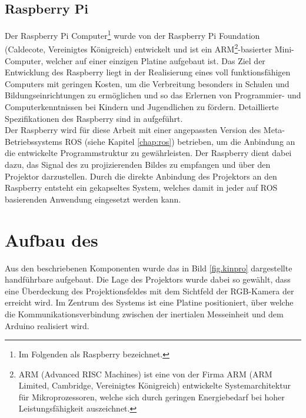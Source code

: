 
\subsection{Raspberry Pi\textsuperscript{\texttrademark}}
Der Raspberry Pi\textsuperscript{\texttrademark} Computer\footnote{Im Folgenden als Raspberry bezeichnet.} wurde von der Raspberry Pi Foundation (Caldecote, Vereinigtes Königreich) entwickelt und ist ein ARM\footnote{ARM (Advanced RISC Machines) ist eine von der Firma ARM (ARM Limited, Cambridge, Vereinigtes Königreich) entwickelte Systemarchitektur für Mikroprozessoren, welche sich durch geringen Energiebedarf bei hoher Leistungsfähigkeit auszeichnet.}-basierter Mini-Computer, welcher auf einer einzigen Platine aufgebaut ist. Das Ziel der Entwicklung des Raspberry liegt in der Realisierung eines voll funktionsfähigen Computers mit geringen Kosten, um die Verbreitung besonders in Schulen und Bildungseinrichtungen zu ermöglichen und so das Erlernen von Programmier- und Computerkenntnissen bei Kindern und Jugendlichen zu fördern. Detaillierte Spezifikationen des Raspberry sind in  aufgeführt.\\

Der Raspberry wird für diese Arbeit mit einer angepassten Version des Meta-Betriebssystems ROS (siehe Kapitel \ref{chap:ros}) betrieben, um die Anbindung an die entwickelte Programmstruktur zu gewährleisten. Der Raspberry dient dabei dazu, das Signal des zu projizierenden Bildes zu empfangen und über den Projektor darzustellen. Durch die direkte Anbindung des Projektors an den Raspberry entsteht ein gekapseltes System, welches damit in jeder auf ROS basierenden Anwendung eingesetzt werden kann.


\section{Aufbau des }
Aus den beschriebenen Komponenten wurde das in Bild \ref{fig.kinpro} dargestellte handführbare \kps{} aufgebaut. Die Lage des Projektors wurde dabei so gewählt, dass eine Überdeckung des Projektionsfeldes mit dem Sichtfeld der RGB-Kamera der \kin erreicht wird. Im Zentrum des Systems ist eine Platine positioniert, über welche die Kommunikationsverbindung zwischen der inertialen Messeinheit und dem Arduino realisiert wird.\\

